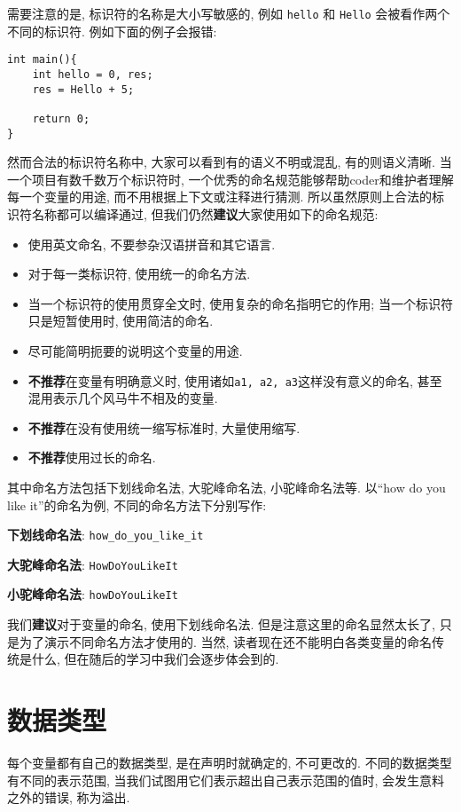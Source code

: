         需要注意的是, 标识符的名称是大小写敏感的, 例如 \texttt{hello} 和 \texttt{Hello} 会被看作两个不同的标识符. 例如下面的例子会报错:
\begin{lstlisting}
int main(){
    int hello = 0, res;
    res = Hello + 5;

    return 0;
}
\end{lstlisting}

        然而合法的标识符名称中, 大家可以看到有的语义不明或混乱, 有的则语义清晰. 当一个项目有数千数万个标识符时, 一个优秀的命名规范能够帮助coder和维护者理解每一个变量的用途, 而不用根据上下文或注释进行猜测. 所以虽然原则上合法的标识符名称都可以编译通过, 但我们仍然\textbf{建议}大家使用如下的命名规范:
        \begin{itemize}
            \item 使用英文命名, 不要参杂汉语拼音和其它语言.
            \item 对于每一类标识符, 使用统一的命名方法.
            \item 当一个标识符的使用贯穿全文时, 使用复杂的命名指明它的作用; 当一个标识符只是短暂使用时, 使用简洁的命名.
            \item 尽可能简明扼要的说明这个变量的用途.
            \item \textbf{不推荐}在变量有明确意义时, 使用诸如\texttt{a1, a2, a3}这样没有意义的命名, 甚至混用表示几个风马牛不相及的变量.
            \item \textbf{不推荐}在没有使用统一缩写标准时, 大量使用缩写.
            \item \textbf{不推荐}使用过长的命名.
        \end{itemize}

        其中命名方法包括下划线命名法, 大驼峰命名法, 小驼峰命名法等. 以``how do you like it''的命名为例, 不同的命名方法下分别写作:

            \textbf{下划线命名法}: \texttt{how\_do\_you\_like\_it}

            \textbf{大驼峰命名法}: \texttt{HowDoYouLikeIt}
            
            \textbf{小驼峰命名法}: \texttt{howDoYouLikeIt}   

        我们\textbf{建议}对于变量的命名, 使用下划线命名法. 但是注意这里的命名显然太长了, 只是为了演示不同命名方法才使用的. 当然, 读者现在还不能明白各类变量的命名传统是什么, 但在随后的学习中我们会逐步体会到的.

    \section{数据类型} \label{数据类型}
        每个变量都有自己的数据类型, 是在声明时就确定的, 不可更改的. 不同的数据类型有不同的表示范围, 当我们试图用它们表示超出自己表示范围的值时, 会发生意料之外的错误, 称为溢出.

